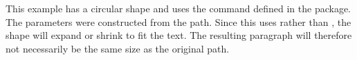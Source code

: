 \begin{minipage}[t]{150bp}

This example has a circular shape and uses the 
command defined in the  package. The parameters 
were constructed from the path. Since this uses
 rather than , the shape will
expand or shrink to fit the text. The resulting paragraph will
therefore not necessarily be the same size as the original path.
\par
\end{minipage}
